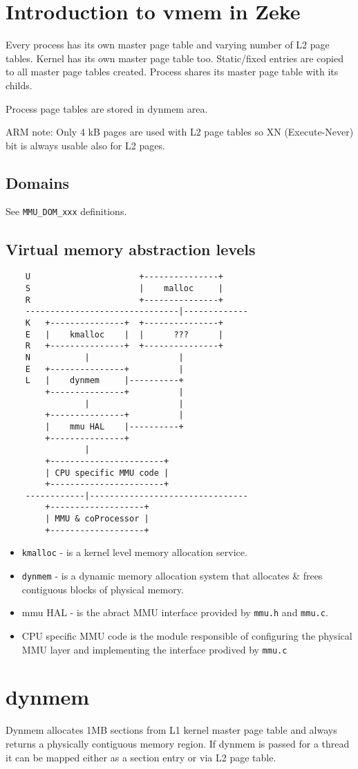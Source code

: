 \section{Introduction to vmem in Zeke}

Every process has its own master page table and varying number of L2 page
tables. Kernel has its own master page table too. Static/fixed entries are
copied to all master page tables created. Process shares its master page
table with its childs.

Process page tables are stored in dynmem area.

ARM note: Only 4 kB pages are used with L2 page tables so XN (Execute-Never) bit
is always usable also for L2 pages.

\subsection{Domains}

See \verb+MMU_DOM_xxx+ definitions.

\subsection{Virtual memory abstraction levels}

\begin{verbatim}
    U                      +---------------+
    S                      |    malloc     |
    R                      +---------------+
    -------------------------------|-------------
    K   +---------------+  +---------------+
    E   |    kmalloc    |  |      ???      |
    R   +---------------+  +---------------+
    N           |                  |
    E   +---------------+          |
    L   |    dynmem     |----------+
        +---------------+          |
                |                  |
        +---------------+          |
        |    mmu HAL    |----------+
        +---------------+
                |
        +-----------------------+
        | CPU specific MMU code |
        +-----------------------+
    ------------|--------------------------------
        +-------------------+
        | MMU & coProcessor |
        +-------------------+
\end{verbatim}

\begin{itemize}
  \item \verb+kmalloc+ - is a kernel level memory allocation service.
  \item \verb+dynmem+ - is a dynamic memory allocation system that allocates \&
        frees contiguous blocks of physical memory.
  \item  mmu HAL - is the abract MMU interface provided by \verb+mmu.h+
         and \verb+mmu.c+.
  \item CPU specific MMU code is the module responsible of configuring the
        physical MMU layer and implementing the interface prodived by
        \verb+mmu.c+
\end{itemize}


\section{dynmem}

Dynmem allocates 1MB sections from L1 kernel master page table and always
returns a physically contiguous memory region. If dynmem is passed for a thread
it can be mapped either as a section entry or via L2 page table.

